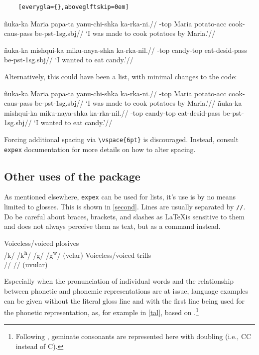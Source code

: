 \documentclass[11pt, letterpaper]{article}
\begin{document}
\begin{verbatim}
    [everygla={},aboveglftskip=0em]
\end{verbatim}

\pex[everygla={},aboveglftskip=0em]
\begingl
\gla \~nuka-ka Maria papa-ta yanu-chi-shka ka-rka-ni.//
-{\sc top} Maria potato-{\sc acc} cook-{\sc caus}-{\sc pass} be-{\sc pst}-{\sc 1sg.sbj}//
\glft ‘I was made to cook potatoes by Maria.’//
\endgl
\xe

\pex[everygla={},aboveglftskip=0em] \begingl
\gla *\~nuka-ka mishqui-ka miku-naya-shka ka-rka-nil.//
-{\sc top} candy-{\sc top} eat-{\sc desid}-{\sc pass} be-{\sc pst}-1{\sc sg.sbj}//
\glft ‘I wanted to eat candy.’//
\endgl
\xe

Alternatively, this could have been a list, with minimal changes to the code:

\pex[everygla={},aboveglftskip=0em]
\a \begingl
\gla \~nuka-ka Maria papa-ta yanu-chi-shka ka-rka-ni.//
-{\sc top} Maria potato-{\sc acc} cook-{\sc caus}-{\sc pass} be-{\sc pst}-{\sc 1sg.sbj}//
\glft ‘I was made to cook potatoes by Maria.’//
\endgl
\a \begingl
\gla *\~nuka-ka mishqui-ka miku-naya-shka ka-rka-nil.//
-{\sc top} candy-{\sc top} eat-{\sc desid}-{\sc pass} be-{\sc pst}-1{\sc sg.sbj}//
\glft ‘I wanted to eat candy.’//
\endgl
\xe

Forcing additional spacing via \verb=\vspace{6pt}= is discouraged. Instead, consult \verb=expex= documentation for more details on how to alter spacing.

\subsection{Other uses of the package}
As mentioned elsewhere, \verb=expex= can be used for lists, it's use is by no means limited to glosses. This is shown in \ref{second}. Lines are usually separated by \verb=//=. Do be careful about braces, brackets, and slashes as \LaTeX is sensitive to them and does not always perceive them as text, but as a command instead.

\pex \label{second}
\a Voiceless/voiced plosives\\ /k/ /k\textsuperscript{h}/ /g/ /g\textsuperscript{w}/    (velar)
\a Voiceless/voiced trills\\ /\textscr/ /\textinvscr/ (uvular)
\xe

Especially when the pronunciation of individual words and the relationship between phonetic and phonemic representations are at issue, language examples can be given without the literal gloss line and with the first line being used for the phonetic representation, as, for example in \ref{tal}, based on \cite{Kiparsky_2003}.\footnote{Following \cite{Kiparsky_2003}, geminate consonants are represented here with doubling (i.e., CC instead of C\textipa{:}).}
\end{document}
